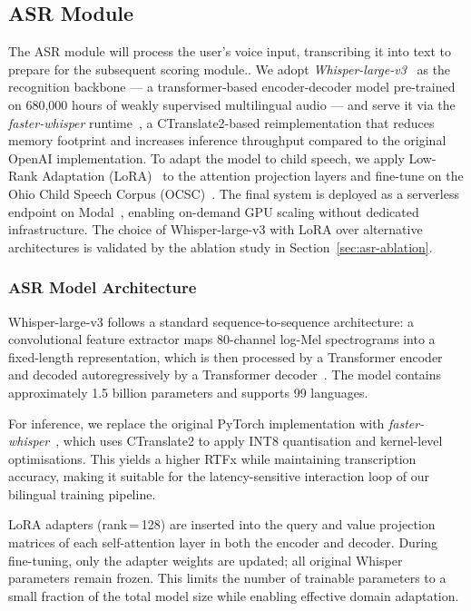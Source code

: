\documentclass{article}
\begin{document}
\subsection{ASR Module}
\label{sec:asr}
 
The ASR module will process the user's voice input, transcribing it into text to prepare for the subsequent scoring module..
We adopt \textit{Whisper-large-v3}~\cite{radford2023whisper} as the
recognition backbone — a transformer-based encoder-decoder model
pre-trained on 680{,}000 hours of weakly supervised multilingual
audio — and serve it via the \textit{faster-whisper}
runtime~\cite{fasterwhisper2023}, a CTranslate2-based reimplementation
that reduces memory footprint and increases inference throughput
compared to the original OpenAI implementation.
To adapt the model to child speech, we apply Low-Rank
Adaptation (LoRA)~\cite{hu2022lora} to the attention projection
layers and fine-tune on the Ohio Child Speech
Corpus (OCSC)~\cite{wagner2025ocsc}.
The final system is deployed as a serverless endpoint on
Modal~\cite{modal2024}, enabling on-demand GPU scaling without
dedicated infrastructure.
The choice of Whisper-large-v3 with LoRA over alternative architectures
is validated by the ablation study in Section~\ref{sec:asr-ablation}.
\subsubsection{ASR Model Architecture}
\label{sec:asr-arch}
 
Whisper-large-v3 follows a standard sequence-to-sequence architecture:
a convolutional feature extractor maps 80-channel log-Mel spectrograms
into a fixed-length representation, which is then processed by a
Transformer encoder and decoded autoregressively by a Transformer
decoder~\cite{radford2023whisper}.
The model contains approximately 1.5 billion parameters and supports
99 languages.
 
For inference, we replace the original PyTorch implementation with
\textit{faster-whisper}~\cite{fasterwhisper2023}, which uses
CTranslate2 to apply INT8 quantisation and kernel-level optimisations.
This yields a higher RTFx while maintaining transcription accuracy,
making it suitable for the latency-sensitive interaction loop of our
bilingual training pipeline.
 
LoRA adapters (rank\,=\,128) are inserted into the query and value
projection matrices of each self-attention layer in both the encoder
and decoder.
During fine-tuning, only the adapter weights are updated; all original
Whisper parameters remain frozen.
This limits the number of trainable parameters to a small fraction of
the total model size while enabling effective domain adaptation.
\end{document}
